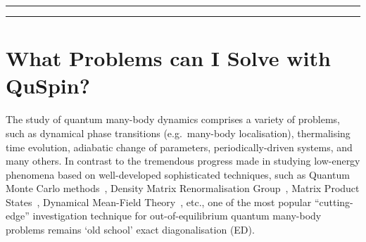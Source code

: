 \documentclass{SciPost}
\newcommand\0{\scalebox{-1}[1]{0}}
\newcommand*{\cyan}{\textcolor{cyan}}
\begin{document}
\vspace{10pt}
\noindent\rule{\textwidth}{1pt}
\tableofcontents\thispagestyle{fancy}
\noindent\rule{\textwidth}{1pt}
\vspace{10pt}


\section{What Problems can I Solve with QuSpin?}
\label{sec:intro}

The study of quantum many-body dynamics comprises a variety of problems, such as dynamical phase transitions (e.g.~many-body localisation), thermalising time evolution, adiabatic change of parameters, periodically-driven systems, and many others. In contrast to the tremendous progress made in studying low-energy phenomena based on well-developed sophisticated techniques, such as Quantum Monte Carlo methods~\cite{pollet_12,foulkes_01,acioli_97}, Density Matrix Renormalisation Group~\cite{daley_04,schollwock_05}, Matrix Product States~\cite{schollwock_11}, Dynamical Mean-Field Theory~\cite{georges_96,kotliar_06,aoki_14}, etc., one of the most popular ``cutting-edge'' investigation technique for out-of-equilibrium quantum many-body problems remains `old school' exact diagonalisation (ED). 
\end{document}
